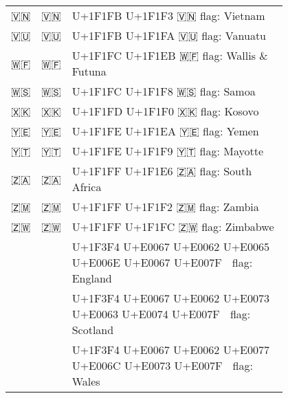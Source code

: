 \documentclass[a4paper,12pt]{article}
\newcommand{\fontA}[1]{{\fontspec[RawFeature={mode=harf,+dist,+ccmp}]{Segoe UI Emoji} #1}}
\newcommand{\fontB}[1]{{\fontspec[RawFeature={mode=harf,+dist,+ccmp}]{Noto Color Emoji} #1}}
\begin{document}
\begin{longtable}[c]{ccp{0.8\linewidth}}
\fontA{🇻🇳}&\fontB{🇻🇳}&U+1F1FB U+1F1F3 🇻🇳 flag: Vietnam\\
\fontA{🇻🇺}&\fontB{🇻🇺}&U+1F1FB U+1F1FA 🇻🇺 flag: Vanuatu\\
\fontA{🇼🇫}&\fontB{🇼🇫}&U+1F1FC U+1F1EB 🇼🇫 flag: Wallis \& Futuna\\
\fontA{🇼🇸}&\fontB{🇼🇸}&U+1F1FC U+1F1F8 🇼🇸 flag: Samoa\\
\fontA{🇽🇰}&\fontB{🇽🇰}&U+1F1FD U+1F1F0 🇽🇰 flag: Kosovo\\
\fontA{🇾🇪}&\fontB{🇾🇪}&U+1F1FE U+1F1EA 🇾🇪 flag: Yemen\\
\fontA{🇾🇹}&\fontB{🇾🇹}&U+1F1FE U+1F1F9 🇾🇹 flag: Mayotte\\
\fontA{🇿🇦}&\fontB{🇿🇦}&U+1F1FF U+1F1E6 🇿🇦 flag: South Africa\\
\fontA{🇿🇲}&\fontB{🇿🇲}&U+1F1FF U+1F1F2 🇿🇲 flag: Zambia\\
\fontA{🇿🇼}&\fontB{🇿🇼}&U+1F1FF U+1F1FC 🇿🇼 flag: Zimbabwe\\
\fontA{🏴󠁧󠁢󠁥󠁮󠁧󠁿}&\fontB{🏴󠁧󠁢󠁥󠁮󠁧󠁿}&U+1F3F4 U+E0067 U+E0062 U+E0065 U+E006E U+E0067 U+E007F 🏴󠁧󠁢󠁥󠁮󠁧󠁿 flag: England\\
\fontA{🏴󠁧󠁢󠁳󠁣󠁴󠁿}&\fontB{🏴󠁧󠁢󠁳󠁣󠁴󠁿}&U+1F3F4 U+E0067 U+E0062 U+E0073 U+E0063 U+E0074 U+E007F 🏴󠁧󠁢󠁳󠁣󠁴󠁿 flag: Scotland\\
\fontA{🏴󠁧󠁢󠁷󠁬󠁳󠁿}&\fontB{🏴󠁧󠁢󠁷󠁬󠁳󠁿}&U+1F3F4 U+E0067 U+E0062 U+E0077 U+E006C U+E0073 U+E007F 🏴󠁧󠁢󠁷󠁬󠁳󠁿 flag: Wales\\
\end{longtable}
\end{document}
